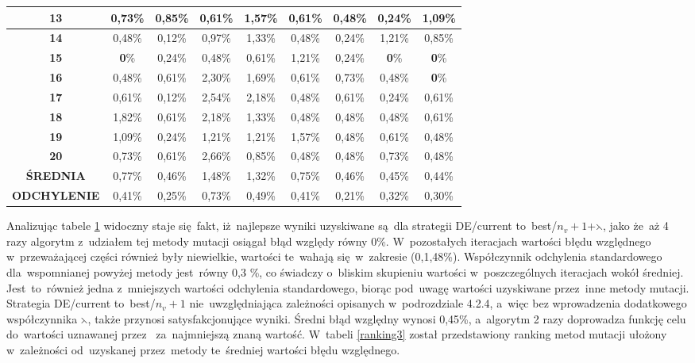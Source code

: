 \begin{itemize}
\begin{table}[h!]
\begin{center}
{\begin{tabular}{|c|c|c|c|c|c|c|c|c|}
\textbf{13}&0,73\%&0,85\%&0,61\%&1,57\%&0,61\%&0,48\%&0,24\%&1,09\% \\ \hline
\textbf{14}&0,48\%&0,12\%&0,97\%&1,33\%&0,48\%&0,24\%&1,21\%&0,85\% \\ \hline
\textbf{15}&\color{green}\textbf{0}\%&0,24\%&0,48\%&0,61\%&1,21\%&0,24\%&\color{green}\textbf{0}\%&\color{green}\textbf{0}\% \\ \hline
\textbf{16}&0,48\%&0,61\%&2,30\%&1,69\%&0,61\%&0,73\%&0,48\%&\color{green}\textbf{0}\% \\ \hline
\textbf{17}&0,61\%&0,12\%&2,54\%&2,18\%&0,48\%&0,61\%&0,24\%&0,61\% \\ \hline
\textbf{18}&1,82\%&0,61\%&2,18\%&1,33\%&0,48\%&0,48\%&0,48\%&0,61\% \\ \hline
\textbf{19}&1,09\%&0,24\%&1,21\%&1,21\%&1,57\%&0,48\%&0,61\%&0,48\% \\ \hline
\textbf{20}&0,73\%&0,61\%&2,66\%&0,85\%&0,48\%&0,48\%&0,73\%&0,48\% \\ \hline
\textbf{ŚREDNIA}&0,77\%&0,46\%&1,48\%&1,32\%&0,75\%&0,46\%&0,45\%&0,44\% \\ \hline
\textbf{ODCHYLENIE}&0,41\%&0,25\%&0,73\%&0,49\%&0,41\%&0,21\%&0,32\%&0,30\% \\ \hline
\end{tabular}}
\label{rankingowa20}
\end{center}
\end{table}
\par
Analizując tabele \ref{rankingowa20} widoczny staje się~fakt, iż~najlepsze wyniki uzyskiwane są~dla strategii DE/current to~best/$n_{v}+1$+$\leftthreetimes$, jako że~aż 4 razy algorytm z~udziałem tej metody mutacji osiągał błąd względy równy 0\%. W~pozostałych iteracjach wartości błędu względnego w~przeważającej części również były niewielkie, wartości te~wahają się~w~zakresie (0,1,48\%). Współczynnik odchylenia standardowego dla~wspomnianej powyżej metody jest~równy 0,3 \%, co świadczy o~bliskim skupieniu wartości w~poszczególnych iteracjach wokół średniej. Jest~to~również jedna z~mniejszych wartości odchylenia standardowego, biorąc pod~uwagę wartości uzyskiwane przez~inne metody mutacji.\\
Strategia DE/current to~best/$n_{v}+1$ nie~uwzględniająca zależności opisanych w~podrozdziale 4.2.4, a~więc bez wprowadzenia dodatkowego współczynnika $\leftthreetimes$, także przynosi satysfakcjonujące wyniki. Średni błąd względny wynosi 0,45\%, a~algorytm 2 razy doprowadza funkcję celu do~wartości uznawanej przez~\cite{qaplib} za~najmniejszą znaną wartość. W~tabeli \ref{ranking3} został przedstawiony ranking metod mutacji ułożony w~zależności od~uzyskanej przez~metody te~średniej wartości błędu względnego.


\end{itemize}
